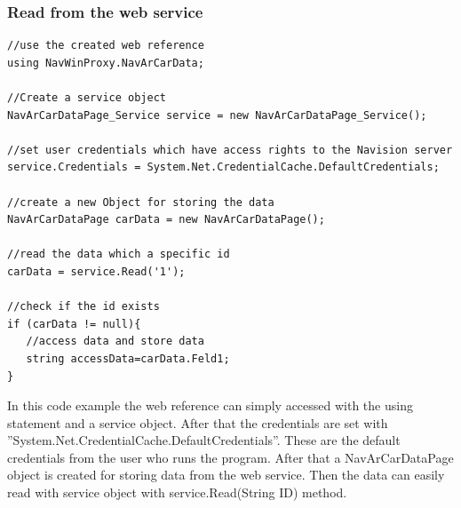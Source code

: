 \subsubsection{Read from the web service}
\begin{lstlisting}[caption=Example reading webservice]
//use the created web reference
using NavWinProxy.NavArCarData;

//Create a service object
NavArCarDataPage_Service service = new NavArCarDataPage_Service();

//set user credentials which have access rights to the Navision server
service.Credentials = System.Net.CredentialCache.DefaultCredentials;

//create a new Object for storing the data
NavArCarDataPage carData = new NavArCarDataPage();
                
//read the data which a specific id
carData = service.Read('1');

//check if the id exists
if (carData != null){
   //access data and store data
   string accessData=carData.Feld1;
}
\end{lstlisting}      

In this code example the web reference can simply accessed with the using statement and a service object. After that the credentials are set with ''System.Net.CredentialCache.DefaultCredentials''.
These are the default credentials from the user who runs the program. After that a  NavArCarDataPage object is created for storing data from the web service. Then the data can easily read with service object with service.Read(String ID)  method.
\newpage
